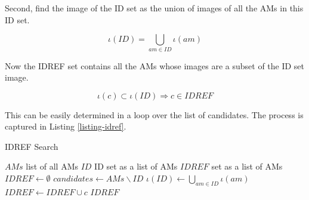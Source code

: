 Second, find the image of the ID set as the union of images of all the AMs in this ID set.

\[\iota(ID) = \bigcup_{am \in ID} \iota(am)\]

Now the IDREF set contains all the AMs whose images are a subset of the ID set image.

\[\iota(c) \subset \iota(ID) \Rightarrow c \in IDREF\]

This can be easily determined in a loop over the list of candidates. The process is captured in Listing \ref{listing-idref}.

\begin{algorithm}
\caption{IDREF Search}
\label{listing-idref}
\begin{algorithmic}
\REQUIRE $AMs$ list of all AMs
\REQUIRE $ID$ ID set as a list of AMs
\ENSURE $IDREF$ set as a list of AMs
\STATE $IDREF \gets \emptyset$
\STATE $candidates \gets AMs \backslash ID$
\STATE $\iota(ID) \gets \bigcup_{am \in ID} \iota(am)$
    \STATE $IDREF \gets IDREF \cup c$
  \ENDIF
\ENDFOR
\RETURN $IDREF$
\end{algorithmic}
\end{algorithm}
